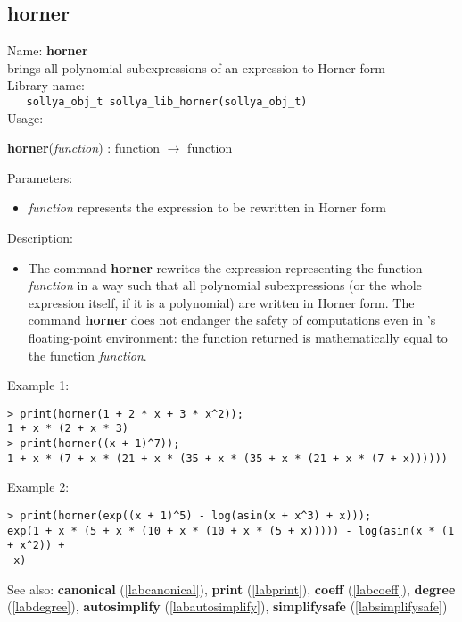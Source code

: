 \subsection{horner}
\label{labhorner}
\noindent Name: \textbf{horner}\\
\phantom{aaa}brings all polynomial subexpressions of an expression to Horner form\\[0.2cm]
\noindent Library name:\\
\verb|   sollya_obj_t sollya_lib_horner(sollya_obj_t)|\\[0.2cm]
\noindent Usage: 
\begin{center}
\textbf{horner}(\emph{function}) : \textsf{function} $\rightarrow$ \textsf{function}\\
\end{center}
Parameters: 
\begin{itemize}
\item \emph{function} represents the expression to be rewritten in Horner form
\end{itemize}
\noindent Description: \begin{itemize}

\item The command \textbf{horner} rewrites the expression representing the function
   \emph{function} in a way such that all polynomial subexpressions (or the
   whole expression itself, if it is a polynomial) are written in Horner
   form.  The command \textbf{horner} does not endanger the safety of
   computations even in \sollya's floating-point environment: the
   function returned is mathematically equal to the function \emph{function}.
\end{itemize}
\noindent Example 1: 
\begin{center}\begin{minipage}{15cm}\begin{Verbatim}[frame=single]
> print(horner(1 + 2 * x + 3 * x^2));
1 + x * (2 + x * 3)
> print(horner((x + 1)^7));
1 + x * (7 + x * (21 + x * (35 + x * (35 + x * (21 + x * (7 + x))))))
\end{Verbatim}
\end{minipage}\end{center}
\noindent Example 2: 
\begin{center}\begin{minipage}{15cm}\begin{Verbatim}[frame=single]
> print(horner(exp((x + 1)^5) - log(asin(x + x^3) + x)));
exp(1 + x * (5 + x * (10 + x * (10 + x * (5 + x))))) - log(asin(x * (1 + x^2)) +
 x)
\end{Verbatim}
\end{minipage}\end{center}
See also: \textbf{canonical} (\ref{labcanonical}), \textbf{print} (\ref{labprint}), \textbf{coeff} (\ref{labcoeff}), \textbf{degree} (\ref{labdegree}), \textbf{autosimplify} (\ref{labautosimplify}), \textbf{simplifysafe} (\ref{labsimplifysafe})
